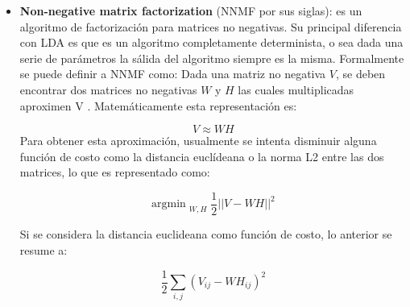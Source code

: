\begin{itemize}
\item \textbf{Non-negative matrix factorization} (NNMF por sus siglas): es un algoritmo de factorización para matrices no negativas. Su principal diferencia con LDA es que es un algoritmo completamente determinista, o sea dada una serie de parámetros la sálida del algoritmo siempre es la misma. Formalmente se puede definir a NNMF como: Dada una matriz no negativa $V$, se deben encontrar dos matrices no negativas $W$ y $H$ las cuales multiplicadas aproximen V \cite{lee1999learning}. Matemáticamente esta representación es:
     
    \begin{equation*}
        V \approx WH
    \end{equation*} 
    Para obtener esta aproximación, usualmente se intenta disminuir alguna función de costo como la distancia euclídeana o la norma L2 entre las dos matrices, lo que es representado como:
    
    \begin{equation*}
        \text{argmin}_{\substack{W,H}} \frac{1}{2}||V-WH||^2
    \end{equation*}
    
    Si se considera la distancia euclideana como función de costo, lo anterior se resume a:
    
    \begin{equation*}
        \frac{1}{2}\sum_{i,j} \left( V_{ij} - WH_{ij} \right)^2 
    \end{equation*}
    

\end{itemize}
